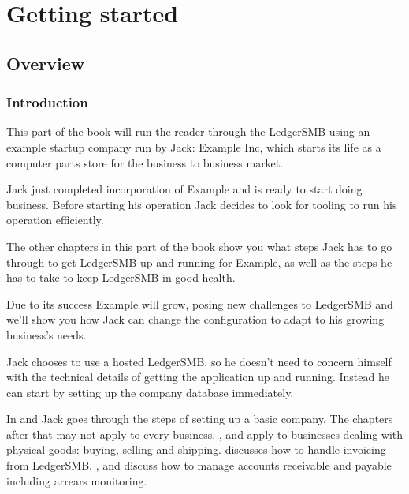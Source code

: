 

\part{Getting started}
\label{part:GettingStarted}

\chapter{Overview}

\section{Introduction}

This part of the book will run the reader through the LedgerSMB using an example
startup company run by Jack: Example Inc, which starts its life as a computer parts
store for the business to business market.

Jack just completed incorporation of Example and is ready to start doing business.
Before starting his operation Jack decides to look for tooling to run his operation
efficiently.

The other chapters in this part of the book show you what steps Jack has to go through
to get LedgerSMB up and running for Example, as well as the steps he has to take to
keep LedgerSMB in good health.

Due to its success Example will grow, posing new challenges to LedgerSMB and we'll show
you how Jack can change the configuration to adapt to his growing business's needs.

Jack chooses to use a hosted LedgerSMB, so he doesn't need to concern himself with the
technical details of getting the application up and running. Instead he can start by setting
up the company database immediately.

In  and  Jack goes through the
steps of setting up a basic company. The chapters after that may not apply to every
business. ,  and
 apply to businesses dealing with physical goods: buying,
selling and shipping.  discusses how to handle invoicing from LedgerSMB.
,  and 
discuss how to manage accounts receivable and payable including arrears monitoring.

